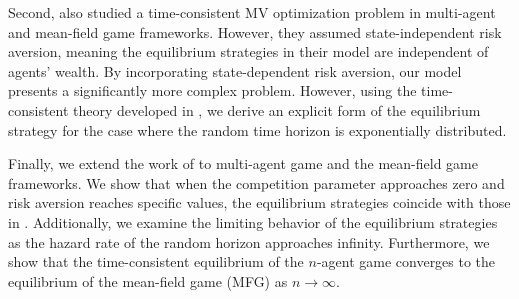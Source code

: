 \documentclass[11pt]{article}
\numberwithin{equation}{section}
\begin{document}
Second, \citet{guan2022time} also studied a time-consistent MV optimization problem in multi-agent and mean-field game frameworks. However, they assumed state-independent risk aversion, meaning the equilibrium strategies in their model are independent of agents' wealth. By incorporating state-dependent risk aversion, our model presents a significantly more complex problem. However, using the time-consistent theory developed in \citet{bjork2017time}, we derive an explicit form of the equilibrium strategy for the case where the random time horizon is exponentially distributed.

Finally, we extend the work of \citet{landriault2018equilibrium} to multi-agent game and the mean-field game frameworks. We show that when the competition parameter approaches zero and risk aversion reaches specific values, the equilibrium strategies coincide with those in \citet{landriault2018equilibrium}. Additionally, we examine the limiting behavior of the equilibrium strategies as the hazard rate of the random horizon approaches infinity. Furthermore, we show that the time-consistent equilibrium of the \( n \)-agent game converges to the equilibrium of the mean-field game (MFG) as $n \to \infty$.
\end{document}
